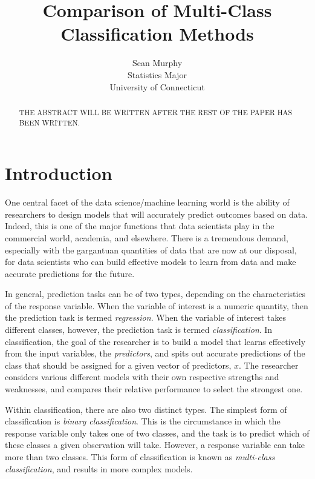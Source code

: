 \documentclass[12pt]{article}
\title{Comparison of Multi-Class Classification Methods}
\author{Sean Murphy\\
  Statistics Major\\
  University of Connecticut
}
\begin{document}
\maketitle

\begin{abstract}
THE ABSTRACT WILL BE WRITTEN AFTER THE REST OF THE PAPER HAS BEEN WRITTEN. 
\end{abstract}

\section{Introduction}
\label{sec:intro}

One central facet of the data science/machine learning world is the ability of 
researchers to design models that will accurately predict outcomes based on data.  
Indeed, this is one of the major functions that data scientists play in the 
commercial world, academia, and elsewhere.  There is a tremendous demand, 
especially with the gargantuan quantities of data that are now at our disposal, 
for data scientists who can build effective models to learn from data and make 
accurate predictions for the future.

In general, prediction tasks can be of two types, depending on the characteristics 
of the response variable.  When the variable of interest is a numeric quantity, 
then the prediction task is termed \textit{regression}.  When the variable of 
interest takes different classes, however, the prediction task is termed 
\textit{classification}.  In classification, the goal of the researcher is to build 
a model that learns effectively from the input variables, the \textit{predictors}, 
and spits out accurate predictions of the class that should be assigned for a given 
vector of predictors, $x$.  The researcher considers various different models with 
their own respective strengths and weaknesses, and compares their relative 
performance to select the strongest one. 

Within classification, there are also two distinct types.  The simplest form of 
classification is \textit{binary classification}.  This is the circumstance in 
which the response variable only takes one of two classes, and the task is to 
predict which of these classes a given observation will take.  However, a response 
variable can take more than two classes.  This form of classification is known as 
\textit{multi-class classification}, and results in more complex models.
\end{document}
